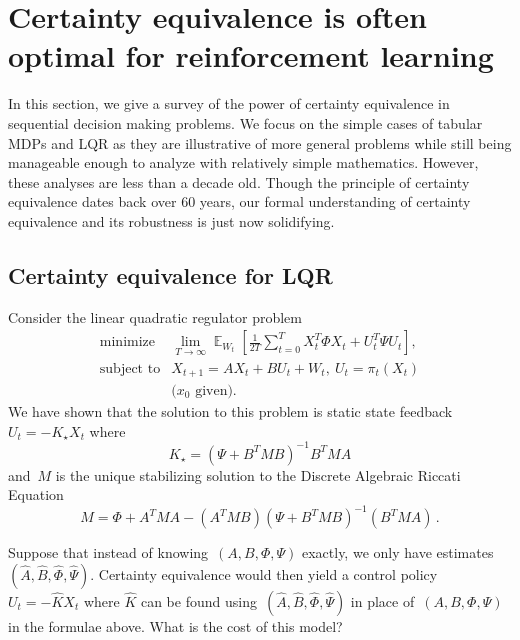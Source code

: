 \documentclass{tufte-book}
\begin{document}
\hypertarget{certainty-equivalence-is-often-optimal-for-reinforcement-learning}{%
\section{Certainty equivalence is often optimal for reinforcement
learning}\label{certainty-equivalence-is-often-optimal-for-reinforcement-learning}}

In this section, we give a survey of the power of certainty equivalence
in sequential decision making problems. We focus on the simple cases of
tabular MDPs and LQR as they are illustrative of more general problems
while still being manageable enough to analyze with relatively simple
mathematics. However, these analyses are less than a decade old. Though
the principle of certainty equivalence dates back over 60 years, our
formal understanding of certainty equivalence and its robustness is just
now solidifying.

\hypertarget{certainty-equivalence-for-lqr}{%
\subsection{Certainty equivalence for
LQR}\label{certainty-equivalence-for-lqr}}


Consider the linear quadratic regulator problem \[
\begin{array}{ll}
\text{minimize} \, & \lim_{T\rightarrow \infty} \mathop\mathbb{E}_{W_t} \left[\frac{1}{2T}\sum_{t=0}^T X_t^T\Phi X_t + U_t^T \Psi U_t\right], \\
\text{subject to} & X_{t+1} = A X_t+ B U_t + W_t,~U_t=\pi_t(X_t) \\
& \text{($x_0$ given).}
\end{array}
\] We have shown that the solution to this problem is static state
feedback~\(U_t = -K_\star X_t\) where \[
    K_\star=(\Psi + B^T M B)^{-1} B^T M A
\] and~\(M\) is the unique stabilizing solution to the Discrete
Algebraic Riccati Equation \[
M = \Phi + A^T M A - (A^T M B)(\Psi + B^T M B)^{-1} (B^T M A)\,.
\]

Suppose that instead of knowing~\((A,B,\Phi,\Psi)\) exactly, we only
have estimates~\((\hat{A},\hat{B},\hat{\Phi},\hat{\Psi})\). Certainty
equivalence would then yield a control policy~\(U_t = -\hat{K} X_t\)
where \(\hat{K}\) can be found
using~\((\hat{A},\hat{B},\hat{\Phi},\hat{\Psi})\) in place
of~\((A,B,\Phi,\Psi)\) in the formulae above. What is the cost of this
model?
\end{document}
